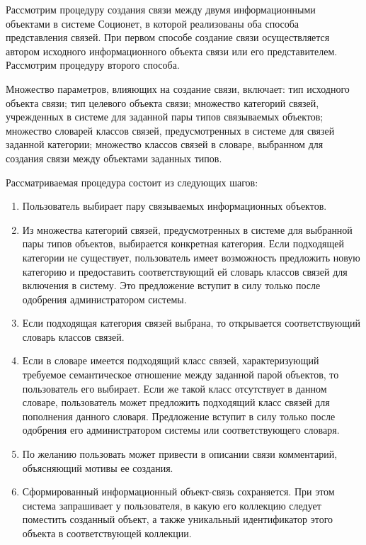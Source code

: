 \begin{multicols}{2}
{}
  
  Рассмотрим процедуру создания связи между двумя информационными 
объектами в системе Соционет, в которой реализованы оба способа 
представления связей. При первом способе создание связи осуществляется 
автором исходного информационного объекта связи или его представителем. 
Рассмотрим процедуру второго способа. 
  
  Множество параметров, влияющих на создание связи, включает: тип 
исходного объекта связи; тип целевого объекта связи; множество категорий 
связей, учрежденных в системе для заданной пары типов связываемых 
объектов; множество словарей классов связей, предусмотренных в системе для 
связей заданной категории; множество классов связей в словаре, выбранном 
для создания связи между объектами заданных типов.
  
  Рассматриваемая процедура состоит из сле\-ду\-ющих шагов: 
  \begin{enumerate}[1.]
\item  Пользователь выбирает пару связываемых информационных объектов.
  \item Из множества категорий связей, предусмотренных в системе для 
выбранной пары типов объектов, выбирается конкретная категория. Если 
подходящей категории не существует, пользователь имеет возможность 
предложить новую категорию и предоставить соответствующий ей словарь 
классов связей для включения в систему. Это предложение вступит в силу 
только после одобрения администратором системы. 
  \item Если подходящая категория связей выбрана, то открывается 
соответствующий словарь классов связей. 
  \item Если в словаре имеется подходящий класс связей, характеризующий 
требуемое семантическое отношение между заданной парой объектов, то 
пользователь его выбирает. Если же такой класс отсутствует в данном словаре, 
пользователь может предложить подходящий класс связей для пополнения 
данного словаря. Предложение вступит в силу только после одобрения его 
администратором системы или соответствующего словаря. 
  \item По желанию пользовать может привести в описании связи 
комментарий, объясняющий мотивы ее создания.
  \item Сформированный информационный объект-связь сохраняется. При 
этом система запрашивает у пользователя, в какую его коллекцию следует 
поместить созданный объект, а также уникальный идентификатор этого 
объекта в соответствующей коллекции. 
  \end{enumerate}
  

\end{multicols}
